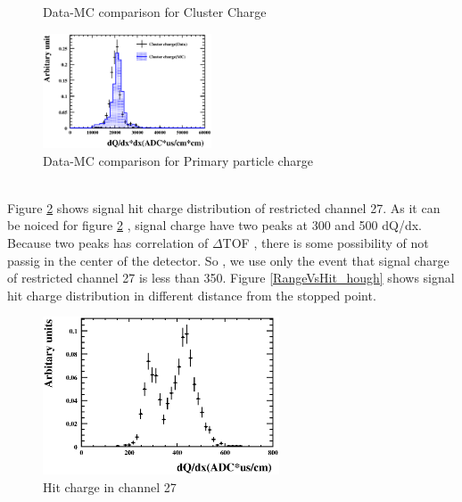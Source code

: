 \begin{figure}[htbp]
\begin{minipage}{0.5\hsize}
\begin{center}
    \end{center}
    \caption{Data-MC comparison for Cluster Charge}
    \label{cClusterCharge_hough}
  \end{minipage}
  \begin{minipage}{0.5\hsize}
    \begin{center}
      \includegraphics[width=50mm]{fig/cCSTSP_hough.eps}
    \end{center}
    \caption{Data-MC comparison for Primary particle charge}
    \label{cPrimaryCharge_hough}
  \end{minipage}
\end{figure}
　\\

Figure \ref{cq27_hough} shows signal hit charge distribution of restricted channel 27. 
As it can be noiced for figure \ref{cq27_hough} , signal charge have two peaks at 300 and 500 dQ/dx.
Because two peaks has correlation of $\Delta$TOF , there is some possibility of not passig in the center of the detector.
So , we use only the event that signal charge of restricted channel 27 is less than 350.
Figure \ref{RangeVsHit_hough} shows signal hit charge distribution in different distance from the stopped point.

\begin{figure}[!htb]
  \begin{center}
    \includegraphics[width=70mm]{fig/cq27_hough.eps}
  \end{center}
  \label{cq27_hough}
  \caption{Hit charge in channel 27}
\end{figure}

